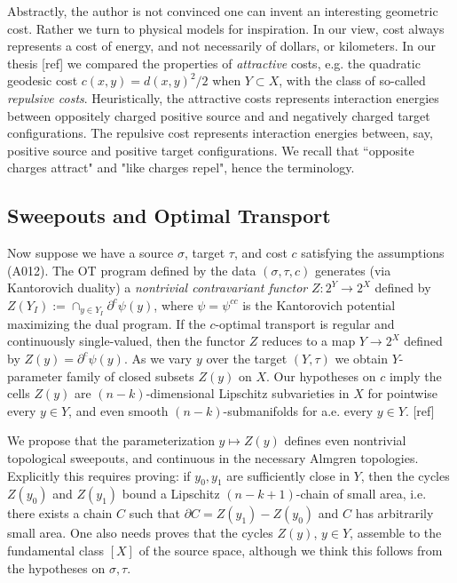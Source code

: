 \documentclass[12pt]{amsart}
\theoremstyle{remark}
\newcommand{\del}{\partial}
\newcommand{\sub}{\del^c \psi(y)}
\begin{document}
Abstractly, the author is not convinced one can invent an interesting geometric cost. Rather we turn to physical models for inspiration. In our view, cost always represents a cost of energy, and not necessarily of dollars, or kilometers. In our thesis [ref] we compared the properties of \emph{attractive} costs, e.g. the quadratic geodesic cost $c(x,y)=d(x,y)^2/2$ when $Y\subset X$, with the class of so-called \emph{repulsive costs}. Heuristically, the attractive costs represents interaction energies between oppositely charged positive source and and negatively charged target configurations. The repulsive cost represents interaction energies between, say, positive source and positive target configurations. We recall that ``opposite charges attract" and "like charges repel", hence the terminology. 



\subsection{Sweepouts and Optimal Transport}
Now suppose we have a source $\sigma$, target $\tau$, and cost $c$ satisfying the assumptions (A012). The OT program defined by the data $(\sigma, \tau, c)$ generates (via Kantorovich duality) a \emph{nontrivial contravariant functor} $Z: 2^Y \to 2^X$ defined by $Z(Y_I):=\cap_{y\in Y_I} \sub$, where $\psi=\psi^{cc}$ is the Kantorovich potential maximizing the dual program. If the $c$-optimal transport is regular and continuously single-valued, then the functor $Z$ reduces to a map $Y\to 2^X$ defined by $Z(y)=\sub$. As we vary $y$ over the target $(Y, \tau)$ we obtain $Y$-parameter family of closed subsets $Z(y)$ on $X$. Our hypotheses on $c$ imply the cells $Z(y)$ are $(n-k)$-dimensional Lipschitz subvarieties in $X$ for pointwise every $y\in Y$, and even smooth $(n-k)$-submanifolds for a.e. every $y\in Y$. [ref] 

We propose that the parameterization $y\mapsto Z(y)$ defines even nontrivial topological sweepouts, and continuous in the necessary Almgren topologies. Explicitly this requires proving: if $y_0, y_1$ are sufficiently close in $Y$, then the cycles $Z(y_0)$ and $Z(y_1)$ bound a Lipschitz $(n-k+1)$-chain of small area, i.e. there exists a chain $C$ such that $\del C = Z(y_1)-Z(y_0)$ and $C$ has arbitrarily small area. One also needs proves that the cycles $Z(y)$, $y\in Y$, assemble to the fundamental class $[X]$ of the source space, although we think this follows from the hypotheses on $\sigma, \tau$.  
\end{document}
